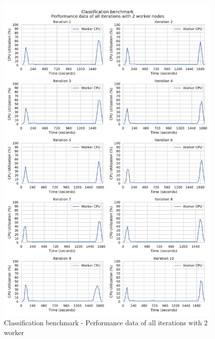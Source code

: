 \begin{figure}[h]
\centering
\includegraphics[scale=0.5]{images/appendix/evaluation_data/classification_benchmark/classification_2_worker_cpu_performance}
\caption{Classification benchmark - Performance data of all iterations with 2 worker}
\label{fig:appendix_eval_classification_static2}
\end{figure}


